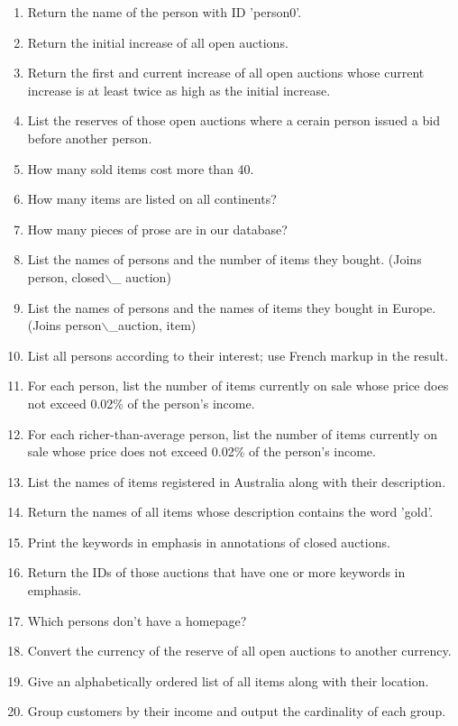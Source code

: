\begin{enumerate}
	\item Return the name of the person with ID 'person0'.
	\item Return the initial increase of all open auctions.
	\item Return the first and current increase of all open auctions whose current increase is at least twice as high as the initial increase.
	\item List the reserves of those open auctions where a cerain person issued a bid before another person.
	\item How many sold items cost more than 40.
	\item How many items are listed on all continents?
	\item How many pieces of prose are in our database?
	\item List the names of persons and the number of items they bought. (Joins person, closed$\backslash$\_ auction) 
	\item List the names of persons and the names of items they bought in Europe. (Joins person$\backslash$\_auction, item)
	\item List all persons according to their interest; use French markup in the result.
	\item For each person, list the number of items currently on sale whose price does not exceed 0.02\% of the person's income.
	\item For each richer-than-average person, list the number of items currently on sale whose price does not exceed 0.02\% of the person's income.
	\item List the names of items registered in Australia along with their description.
	\item Return the names of all items whose description contains the word 'gold'.
	\item Print the keywords in emphasis in annotations of closed auctions.
	\item Return the IDs of those auctions that have one or more keywords in emphasis.
	\item Which persons don't have a homepage?
	\item Convert the currency of the reserve of all open auctions to another currency.
	\item Give an alphabetically ordered list of all items along with their location.
	\item Group customers by their income and output the cardinality of each group.
\end{enumerate}



